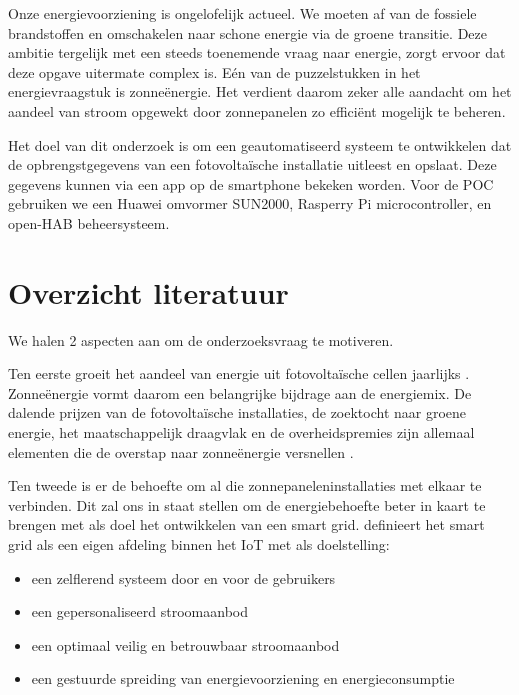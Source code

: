 \documentclass{hogent-article}
\begin{document}
    Onze energievoorziening is ongelofelijk actueel. We moeten af van de fossiele brandstoffen en omschakelen naar schone energie via de groene transitie. Deze ambitie tergelijk met een steeds toenemende vraag naar energie, zorgt ervoor dat deze opgave uitermate complex is. Eén van de puzzelstukken in het energievraagstuk is zonneënergie. Het verdient daarom zeker alle aandacht om het aandeel van stroom opgewekt door zonnepanelen zo efficiënt mogelijk te beheren.
    
    Het doel van dit onderzoek is om een geautomatiseerd systeem te ontwikkelen dat de opbrengstgegevens van een fotovoltaïsche installatie uitleest en opslaat. Deze gegevens kunnen via een app op de smartphone bekeken worden. Voor de POC gebruiken we een Huawei omvormer SUN2000, Rasperry Pi microcontroller, en open-HAB beheersysteem.
    
    \section{Overzicht literatuur}
    
    
    We halen 2 aspecten aan om de onderzoeksvraag te motiveren.
    
    Ten eerste groeit het aandeel van energie uit fotovoltaïsche cellen jaarlijks \autocite{Shurtleff2014}. Zonneënergie vormt daarom een belangrijke bijdrage aan de energiemix. De dalende prijzen van de fotovoltaïsche installaties, de zoektocht naar groene energie, het maatschappelijk draagvlak en de overheidspremies zijn allemaal elementen die de overstap naar zonneënergie versnellen \autocite{Kouro2015}.
    
    Ten tweede is er de behoefte om al die zonnepaneleninstallaties met elkaar te verbinden. Dit zal ons in staat stellen om de energiebehoefte beter in kaart te brengen met als doel het ontwikkelen van een smart grid. \textcite{Vijayapriya2011} definieert het smart grid als een eigen afdeling binnen het IoT met als doelstelling:
    \begin{itemize}
        \item een zelflerend systeem door en voor de gebruikers
        \item een gepersonaliseerd stroomaanbod
        \item een optimaal veilig en betrouwbaar stroomaanbod
        \item een gestuurde spreiding van energievoorziening en energieconsumptie
    \end{itemize}
\end{document}
